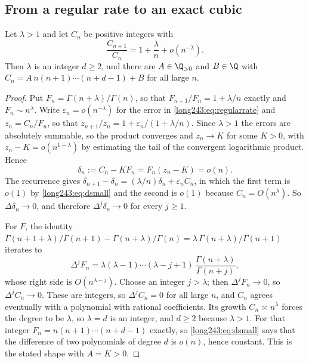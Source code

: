 \documentclass[11pt]{article}
\begin{document}
\subsection{From a regular rate to an exact cubic}

\begin{lemma}\label{long243:res:extraction}
Let $\lambda>1$ and let $C_n$ be positive integers with
\begin{equation}\label{long243:eq:regularrate}
 \frac{C_{n+1}}{C_n}=1+\frac\lambda n+o(n^{-\lambda}).
\end{equation}
Then $\lambda$ is an integer $d\ge2$, and there are $A\in\Q_{>0}$ and
$B\in\Q$ with $C_n=A\,n(n+1)\cdots(n+d-1)+B$ for all large $n$.
\end{lemma}

\begin{proof}
Put $F_n=\Gamma(n+\lambda)/\Gamma(n)$, so that $F_{n+1}/F_n=1+\lambda/n$
exactly and $F_n\sim n^\lambda$.  Write $\varepsilon_n=o(n^{-\lambda})$ for the
error in \eqref{long243:eq:regularrate} and $z_n=C_n/F_n$, so that
$z_{n+1}/z_n=1+\varepsilon_n/(1+\lambda/n)$.  Since $\lambda>1$ the errors are
absolutely summable, so the product converges and $z_n\to K$ for some $K>0$,
with $z_n-K=o(n^{1-\lambda})$ by estimating the tail of the convergent
logarithmic product.  Hence
\begin{equation}\label{long243:eq:dsmall}
 \delta_n:=C_n-KF_n=F_n(z_n-K)=o(n).
\end{equation}
The recurrence gives
$\delta_{n+1}-\delta_n=(\lambda/n)\delta_n+\varepsilon_nC_n$, in which the
first term is $o(1)$ by \eqref{long243:eq:dsmall} and the second is $o(1)$ because
$C_n=O(n^\lambda)$.  So $\Delta\delta_n\to0$, and therefore
$\Delta^j\delta_n\to0$ for every $j\ge1$.

For $F$, the identity $\Gamma(n+1+\lambda)/\Gamma(n+1)-\Gamma(n+\lambda)/\Gamma(n)
=\lambda\,\Gamma(n+\lambda)/\Gamma(n+1)$ iterates to
\[
 \Delta^jF_n=\lambda(\lambda-1)\cdots(\lambda-j+1)\,
 \frac{\Gamma(n+\lambda)}{\Gamma(n+j)},
\]
whose right side is $O(n^{\lambda-j})$.  Choose an integer $j>\lambda$; then
$\Delta^jF_n\to0$, so $\Delta^jC_n\to0$.  These are integers, so
$\Delta^jC_n=0$ for all large $n$, and $C_n$ agrees eventually with a
polynomial with rational coefficients.  Its growth $C_n\asymp n^\lambda$ forces
the degree to be $\lambda$, so $\lambda=d$ is an integer, and $d\ge2$ because
$\lambda>1$.  For that integer $F_n=n(n+1)\cdots(n+d-1)$ exactly, so
\eqref{long243:eq:dsmall} says that the difference of two polynomials of degree $d$ is
$o(n)$, hence constant.  This is the stated shape with $A=K>0$.
\end{proof}
\end{document}
